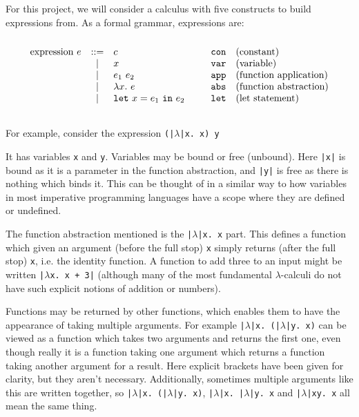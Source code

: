 \documentclass[a4paper,fleqn,oneside,12pt]{report}
\begin{document}
For this project, we will consider a calculus with five constructs to build expressions from. As a formal grammar, expressions are:
$$\begin{array}{lcllll}
  \\
    \textrm{expression}\ e & ::= & c                       & \hspace{0.25cm} & \mathtt{con} & \textrm{(constant)}\\
                         & \vert & x                                       & & \mathtt{var} & \textrm{(variable)}\\
                         & \vert & e_1\ e_2                                & & \mathtt{app} & \textrm{(function application)}\\
                         & \vert & \lambda x.\ e                           & & \mathtt{abs} & \textrm{(function abstraction)} \\
                         & \vert & \mathtt{let}\ x = e_1\ \mathtt{in}\ e_2 & & \mathtt{let} & \textrm{(let statement)}\\
  \\
\end{array}$$

For example, consider the expression \texttt{(|$\lambda$|x. x) y}

It has variables \texttt{x} and \texttt{y}. Variables may be bound or free (unbound). Here \texttt{|x|} is bound as it is a parameter in the function abstraction, and \texttt{|y|} is free as there is nothing which binds it. This can be thought of in a similar way to how variables in most imperative programming languages have a scope where they are defined or undefined.

The function abstraction mentioned is the \texttt{|$\lambda$|x. x} part. This defines a function which given an argument (before the full stop) \texttt{x} simply returns (after the full stop) \texttt{x}, i.e. the identity function. A function to add three to an input might be written \texttt{|$\lambda$x. x + 3|} (although many of the most fundamental $\lambda$-calculi do not have such explicit notions of addition or numbers).

Functions may be returned by other functions, which enables them to have the appearance of taking multiple arguments. For example \texttt{|$\lambda$|x. (|$\lambda$|y. x)} can be viewed as a function which takes two arguments and returns the first one, even though really it is a function taking one argument which returns a function taking another argument for a result. Here explicit brackets have been given for clarity, but they aren’t necessary. Additionally, sometimes multiple arguments like this are written together, so \texttt{|$\lambda$|x. (|$\lambda$|y. x)}, \texttt{|$\lambda$|x. |$\lambda$|y. x} and \texttt{|$\lambda$|xy. x} all mean the same thing.
\end{document}
